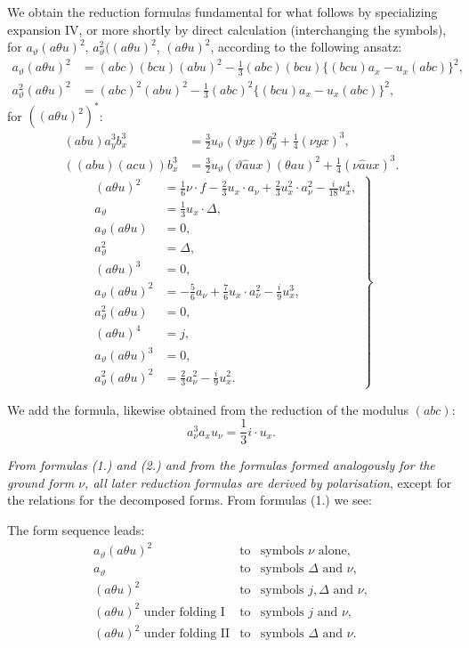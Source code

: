 \documentclass[11pt]{article}
\newcommand{\A}{\Delta}
\begin{document}
We obtain the reduction formulas fundamental for what follows by specializing expansion IV, or more shortly by direct calculation (interchanging the symbols), for $a_\vartheta(a\theta u)^2$, $a_\vartheta^2((a\theta u)^2$, $(a\theta u)^2$, according to the following ansatz:
\[
\begin{aligned}
a_\vartheta(a\theta u)^2
&=(abc)(bcu)(abu)^2-\frac13(abc)(bcu)\{(bcu)a_x-u_x(abc)\}^2,\\
a_\vartheta^2(a\theta u)^2
&=(abc)^2(abu)^2-\frac13(abc)^2\{(bcu)a_x-u_x(abc)\}^2,
\end{aligned}
\]
for $((a\theta u)^2)^{*}$:
\[
\begin{aligned}
(abu)a_y^3b_x^3&=\frac32u_\vartheta(\vartheta yx)\theta_y^2+\frac14(\nu yx)^3,\\
((abu)(acu))b_x^3&=\frac32u_\vartheta(\vartheta\widehat{a}ux)(\theta au)^2+\frac14(\nu\widehat{a}ux)^3.
\end{aligned}
\]
\[
\left.
\begin{aligned}
(a\theta u)^2&=\frac16\nu\cdot f-\frac23u_x\cdot a_\nu
+\frac23u_x^2\cdot a_\nu^2-\frac{i}{18}u_x^4,\\
a_\vartheta&=\frac13u_x\cdot\A,\\
a_\vartheta(a\theta u)&=0,\\
a_\vartheta^2&=\A,\\
(a\theta u)^3&=0,\\
a_\vartheta(a\theta u)^2&=-\frac56a_\nu+\frac76u_x\cdot a_\nu^2-\frac{i}{9}u_x^3,\\
a_\vartheta^2(a\theta u)&=0,\\
(a\theta u)^4&=j,\\
a_\vartheta(a\theta u)^3&=0,\\
a_\vartheta^2(a\theta u)^2&=\frac23a_\nu^2-\frac{i}{9}u_x^2.
\end{aligned}
\right\} \tag{1}
\]

We add the formula, likewise obtained from the reduction of the modulus $(abc)$:
\[
a_\nu^3a_xu_\nu=\frac13 i\cdot u_x. \tag{2}
\]

\emph{From formulas (1.) and (2.) and from the formulas formed analogously for the ground form $\nu$, all later reduction formulas are derived by polarisation}, except for the relations for the decomposed forms. From formulas (1.) we see:

The form sequence leads:
\[
\begin{array}{rcl}
a_\vartheta(a\theta u)^2 &\text{to}& \text{symbols }\nu\text{ alone},\\[0.2em]
a_\vartheta &\text{to}& \text{symbols }\A\text{ and }\nu,\\[0.2em]
(a\theta u)^2 &\text{to}& \text{symbols }j,\A\text{ and }\nu,\\[0.2em]
(a\theta u)^2\text{ under folding I} &\text{to}& \text{symbols }j\text{ and }\nu,\\[0.2em]
(a\theta u)^2\text{ under folding II} &\text{to}& \text{symbols }\A\text{ and }\nu.
\end{array}
\]
\end{document}
